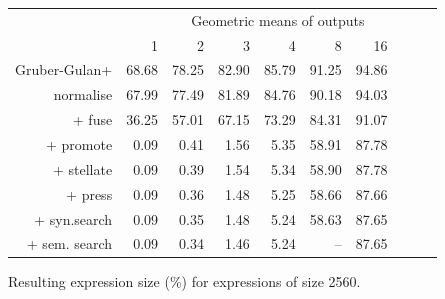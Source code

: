\begin{figure}\begin{tabular}{rrrrrrrrrr}
 & \multicolumn{9}{c}{Geometric means of outputs} \\
 & 1 & 2 & 3 & 4 & 8 & 16 \\
Gruber-Gulan+ & 68.68 & 78.25 & 82.90 & 85.79 & 91.25 & 94.86 \\
normalise & 67.99 & 77.49 & 81.89 & 84.76 & 90.18 & 94.03 \\
+ fuse & 36.25 & 57.01 & 67.15 & 73.29 & 84.31 & 91.07 \\
+ promote & 0.09 & 0.41 & 1.56 & 5.35 & 58.91 & 87.78 \\
+ stellate & 0.09 & 0.39 & 1.54 & 5.34 & 58.90 & 87.78 \\
+ press & 0.09 & 0.36 & 1.48 & 5.25 & 58.66 & 87.66 \\
+ syn.search & 0.09 & 0.35 & 1.48 & 5.24 & 58.63 & 87.65 \\
+ sem. search & 0.09 & 0.34 & 1.46 & 5.24 & -- & 87.65 \\
\end{tabular}\caption{Resulting expression size (\%) for expressions of size 2560.}\end{figure}
